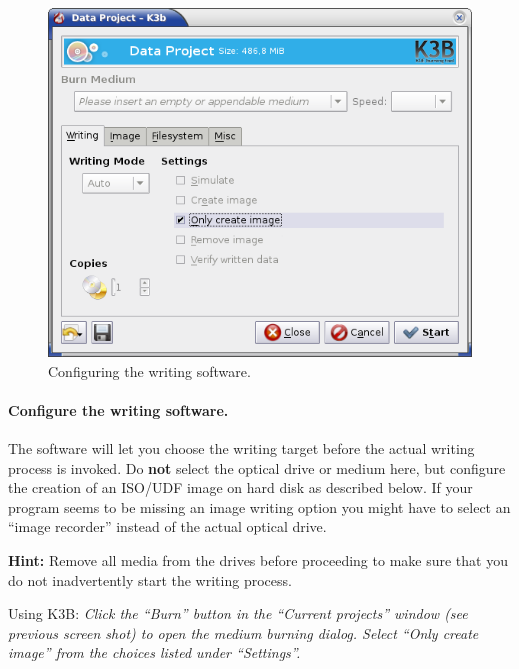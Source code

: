 \newpage
\begin{figure}[h]
\centerline{\includegraphics[width=\textwidth]{screenshots/make-iso3.png}}
\caption{Configuring the writing software.}  
\label{howto-augment-make-iso-configure}
\end{figure}

\paragraph{Configure the writing software.} The software will let you
choose the writing target before the actual writing process is invoked.
Do {\bf not} select the optical drive or medium here, but configure the creation
of an ISO/UDF image on hard disk as described below. If your program seems
to be missing an image writing option you might have to select
an ``image recorder'' instead of the actual optical drive.

\smallskip

{\bf Hint:} Remove all media from the drives before proceeding
to make sure that you do not inadvertently start the writing process.

\bigskip

Using K3B: {\em Click the ``Burn'' button in the ``Current projects''
  window (see previous screen shot) to open the medium burning dialog.
  Select ``Only create image'' from the choices listed under ``Settings''.} 

